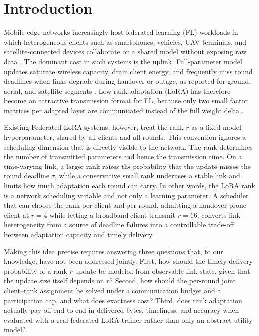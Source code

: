 \documentclass[preprint,12pt]{elsarticle}
\begin{document}
\section{Introduction}
\label{sec:intro}

Mobile edge networks increasingly host federated learning (FL) workloads in which heterogeneous clients such as smartphones, vehicles, UAV terminals, and satellite-connected devices collaborate on a shared model without exposing raw data \cite{mcmahan2017fedavg,kairouz2021advances,liu2018sagin,mahboob2024ntn}. The dominant cost in such systems is the uplink. Full-parameter model updates saturate wireless capacity, drain client energy, and frequently miss round deadlines when links degrade during handover or outage, as reported for ground, aerial, and satellite segments \cite{razmi2022ground,tang2023flsagin,qin2024dfrl,ribero2023intermittent}. Low-rank adaptation (LoRA) has therefore become an attractive transmission format for FL, because only two small factor matrices per adapted layer are communicated instead of the full weight delta \cite{hu2022lora,babakniya2023slora,zhang2024fedit}.

Existing Federated LoRA systems, however, treat the rank $r$ as a fixed model hyperparameter, shared by all clients and all rounds. This convention ignores a scheduling dimension that is directly visible to the network. The rank determines the number of transmitted parameters and hence the transmission time. On a time-varying link, a larger rank raises the probability that the update misses the round deadline $\tau$, while a conservative small rank underuses a stable link and limits how much adaptation each round can carry. In other words, the LoRA rank is a network scheduling variable and not only a learning parameter. A scheduler that can choose the rank per client and per round, admitting a handover-prone client at $r{=}4$ while letting a broadband client transmit $r{=}16$, converts link heterogeneity from a source of deadline failures into a controllable trade-off between adaptation capacity and timely delivery.

Making this idea precise requires answering three questions that, to our knowledge, have not been addressed jointly. First, how should the timely-delivery probability of a rank-$r$ update be modeled from observable link state, given that the update size itself depends on $r$? Second, how should the per-round joint client--rank assignment be solved under a communication budget and a participation cap, and what does exactness cost? Third, does rank adaptation actually pay off end to end in delivered bytes, timeliness, and accuracy when evaluated with a real federated LoRA trainer rather than only an abstract utility model?
\end{document}

